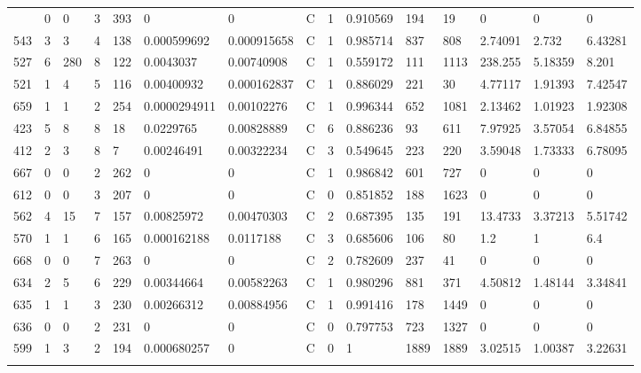 \begin{latin}
\begin{longtable}{lllllllllllllll}
\begin{comment}
	798 & 0  & 0   & 3  & 393 & 0              & 0              & C & 1  & 0.910569 & 194  & 19   & 0       & 0       & 0       \\
	543 & 3  & 3   & 4  & 138 & 0.000599692    & 0.000915658    & C & 1  & 0.985714 & 837  & 808  & 2.74091 & 2.732   & 6.43281 \\
	527 & 6  & 280 & 8  & 122 & 0.0043037      & 0.00740908     & C & 1  & 0.559172 & 111  & 1113 & 238.255 & 5.18359 & 8.201   \\
	521 & 1  & 4   & 5  & 116 & 0.00400932     & 0.000162837    & C & 1  & 0.886029 & 221  & 30   & 4.77117 & 1.91393 & 7.42547 \\
	659 & 1  & 1   & 2  & 254 & 0.0000294911   & 0.00102276     & C & 1  & 0.996344 & 652  & 1081 & 2.13462 & 1.01923 & 1.92308 \\
	423 & 5  & 8   & 8  & 18  & 0.0229765      & 0.00828889     & C & 6  & 0.886236 & 93   & 611  & 7.97925 & 3.57054 & 6.84855 \\
	412 & 2  & 3   & 8  & 7   & 0.00246491     & 0.00322234     & C & 3  & 0.549645 & 223  & 220  & 3.59048 & 1.73333 & 6.78095 \\
	667 & 0  & 0   & 2  & 262 & 0              & 0              & C & 1  & 0.986842 & 601  & 727  & 0       & 0       & 0       \\
	612 & 0  & 0   & 3  & 207 & 0              & 0              & C & 0  & 0.851852 & 188  & 1623 & 0       & 0       & 0       \\
	562 & 4  & 15  & 7  & 157 & 0.00825972     & 0.00470303     & C & 2  & 0.687395 & 135  & 191  & 13.4733 & 3.37213 & 5.51742 \\
	570 & 1  & 1   & 6  & 165 & 0.000162188    & 0.0117188      & C & 3  & 0.685606 & 106  & 80   & 1.2     & 1       & 6.4     \\
	668 & 0  & 0   & 7  & 263 & 0              & 0              & C & 2  & 0.782609 & 237  & 41   & 0       & 0       & 0       \\
	634 & 2  & 5   & 6  & 229 & 0.00344664     & 0.00582263     & C & 1  & 0.980296 & 881  & 371  & 4.50812 & 1.48144 & 3.34841 \\
	635 & 1  & 1   & 3  & 230 & 0.00266312     & 0.00884956     & C & 1  & 0.991416 & 178  & 1449 & 0       & 0       & 0       \\
	636 & 0  & 0   & 2  & 231 & 0              & 0              & C & 0  & 0.797753 & 723  & 1327 & 0       & 0       & 0       \\
	599 & 1  & 3   & 2  & 194 & 0.000680257    & 0              & C & 0  & 1        & 1889 & 1889 & 3.02515 & 1.00387 & 3.22631 \\

\end{comment}
\end{longtable}
\end{latin}
